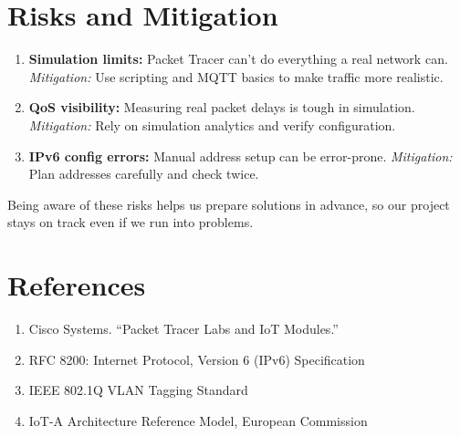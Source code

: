 \documentclass[12pt,a4paper]{article}
\begin{document}
\vspace{1em}

\newpage
{}
\section*{Risks and Mitigation}
\begin{enumerate}[label=8.\arabic*, nosep]
    \item \textbf{Simulation limits:} Packet Tracer can’t do everything a real network can.
    \textit{Mitigation:} Use scripting and MQTT basics to make traffic more realistic.
    \item \textbf{QoS visibility:} Measuring real packet delays is tough in simulation.
    \textit{Mitigation:} Rely on simulation analytics and verify configuration.
    \item \textbf{IPv6 config errors:} Manual address setup can be error-prone.
    \textit{Mitigation:} Plan addresses carefully and check twice.
\end{enumerate}
Being aware of these risks helps us prepare solutions in advance, so our project stays on track even if we run into problems.

\vspace{1em}

\section*{References}
\begin{enumerate}[label=9.\arabic*, nosep]
    \item Cisco Systems. ``Packet Tracer Labs and IoT Modules.''
    \item RFC 8200: Internet Protocol, Version 6 (IPv6) Specification
    \item IEEE 802.1Q VLAN Tagging Standard
    \item IoT-A Architecture Reference Model, European Commission
\end{enumerate}
\end{document}
